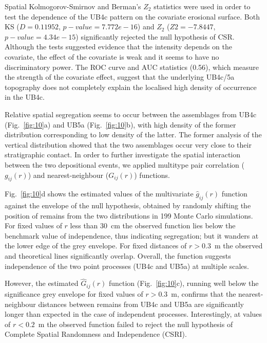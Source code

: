 \documentclass[preprint,authoryear,times]{elsarticle} %
\begin{document}
Spatial Kolmogorov-Smirnov and Berman's $Z_2$ \citep{Berman1986} statistics were used in order to test the dependence of the UB4c pattern on the covariate erosional surface. Both KS ($D=0.11952$, $p-value=7.772e-16$) and $Z_2$ ($Z2=-7.8447$, $p-value=4.34e-15$) significantly rejected the null hypothesis of CSR. Although the tests suggested evidence that the intensity depends on the covariate, the effect of the covariate is weak and it seems to have no discriminatory power. The ROC curve and AUC statistics (0.56), which measure the strength of the covariate effect, suggest that the underlying UB4c/5a topography does not completely explain the localised high density of occurrence in the UB4c.

Relative spatial segregation seems to occur between the assemblages from UB4c (Fig.~\ref{fig:10}a) and UB5a (Fig.~\ref{fig:10}b), with high density of the former distribution corresponding to low density of the latter. The former analysis of the vertical distribution showed that the two assemblages occur very close to their stratigraphic contact. In order to further investigate the spatial interaction between the two depositional events, we applied multitype pair correlation ($g_{ij}(r)$) and nearest-neighbour ($G_{ij}(r)$) functions.

Fig.~\ref{fig:10}d shows the estimated values of the multivariate $\hat{g}_{ij}(r)$ function against the envelope of the null hypothesis, obtained by randomly shifting the position of remains from the two distributions in 199 Monte Carlo simulations. For fixed values of $r$ less than 30~cm the observed function lies below the benchmark value of independence, thus indicating segregation; but it wanders at the lower edge of the grey envelope. For fixed distances of $r>0.3$~m the observed and theoretical lines significantly overlap. Overall, the function suggests independence of the two point processes (UB4c and UB5a) at multiple scales.

However, the estimated $\hat{G}_{ij}(r)$ function (Fig.~\ref{fig:10}c), running well below the significance grey envelope for fixed values of $r>0.3$~m, confirms that the nearest-neighbour distances between remains from UB4c and UB5a are significantly longer than expected in the case of independent processes. Interestingly, at values of $r<0.2$~m the observed function failed to reject the null hypothesis of Complete Spatial Randomness and Independence (CSRI).
\end{document}
